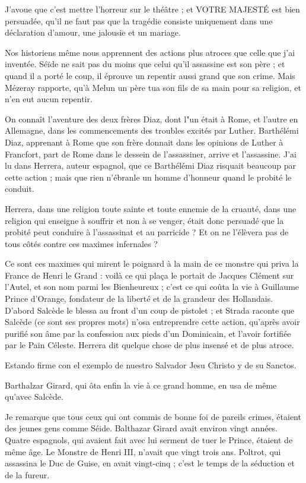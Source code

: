 \documentclass[french,twoside]{book} %
\begin{document}
J’avoue que c’est mettre l’horreur sur le théâtre ; et VOTRE MAJESTÉ est bien persuadée, qu’il ne faut pas que la tragédie consiste uniquement dans une déclaration d’amour, une jalousie et un mariage.\par
Nos historiens même nous apprennent des actions plus atroces que celle que j’ai inventée. Séïde ne sait pas du moins que celui qu’il assassine est son père ; et quand il a porté le coup, il éprouve un repentir aussi grand que son crime. Mais Mézeray rapporte, qu’à Melun un père tua son fils de sa main pour sa religion, et n’en eut aucun repentir.\par
On connaît l’aventure des deux frères Diaz, dont l"un était à Rome, et l’autre en Allemagne, dans les commencements des troubles excités par Luther. Barthélémi Diaz, apprenant à Rome que son frère donnait dans les opinions de Luther à Francfort, part de Rome dans le dessein de l’assassiner, arrive et l’assassine. J’ai lu dans Herrera, auteur espagnol, que ce Barthélémi Diaz risquait beaucoup par cette action ; mais que rien n’ébranle un homme d’honneur quand le probité le conduit.\par
Herrera, dans une religion toute sainte et toute ennemie de la cruauté, dans une religion qui enseigne à souffrir et non à se venger, était donc persuadé que la probité peut conduire à l’assassinat et au parricide ? Et on ne l’élèvera pas de tous côtés contre ces maximes infernales ?\par
Ce sont ces maximes qui mirent le poignard à la main de ce monstre qui priva la France de Henri le Grand : voilà ce qui plaça le portait de Jacques Clément sur l’Autel, et son nom parmi les Bienheureux ; c’est ce qui coûta la vie à Guillaume Prince d’Orange, fondateur de la liberté et de la grandeur des Hollandais. D’abord Salcède le blessa au front d’un coup de pistolet ; et Strada raconte que Salcède (ce sont ses propres mots) n’osa entreprendre cette action, qu’après avoir purifié son âme par la confession aux pieds d’un Dominicain, et l’avoir fortifiée par le Pain Céleste. Herrera dit quelque chose de plus insensé et de plus atroce.\par
Estando firme con el exemplo de nuestro Salvador Jesu Christo y de su Sanctos.\par
Barthalzar Girard, qui ôta enfin la vie à ce grand homme, en usa de même qu’avec Salcède.\par
Je remarque que tous ceux qui ont commis de bonne foi de pareils crimes, étaient des jeunes gens comme Séide. Balthazar Girard avait environ vingt années. Quatre espagnols, qui avaient fait avec lui serment de tuer le Prince, étaient de même âge. Le Monstre de Henri III, n’avait que vingt trois ans. Poltrot, qui assassina le Duc de Guise, en avait vingt-cinq ; c’est le temps de la séduction et de la fureur.\par
\end{document}
